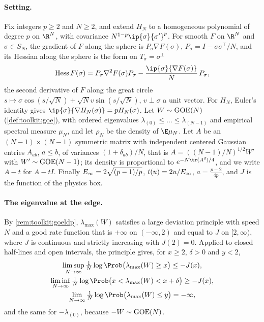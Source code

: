 \begin{refsection}
\paragraph{Setting.} Fix integers $p\ge2$ and $N\ge2$, and extend $H_N$ to a homogeneous polynomial of degree $p$ on $\R^N$, with covariance $N^{1-p}\ip{\sigma}{\sigma'}^p$. For smooth $F$ on $\R^N$ and $\sigma\in S_N$, the gradient of $F$ along the sphere is $P_\sigma\nabla F(\sigma)$, $P_\sigma=I-\sigma\sigma^\top/N$, and its Hessian along the sphere is the form on $T_\sigma=\sigma^\perp$
\begin{equation}\label{eq:kacrice:hess}
\kacriceHess F(\sigma)=P_\sigma\nabla^2F(\sigma)P_\sigma-\frac{\ip{\sigma}{\nabla F(\sigma)}}N\,P_\sigma,
\end{equation}
the second derivative of $F$ along the great circle $s\mapsto\sigma\cos(s/\sqrt N)+\sqrt Nv\sin(s/\sqrt N)$, $v\perp\sigma$ a unit vector. For $H_N$, Euler's identity gives $\ip{\sigma}{\nabla H_N(\sigma)}=pH_N(\sigma)$. Let $W\sim\mathrm{GOE}(N)$ (\cref{def:toolkit:goe}), with ordered eigenvalues $\lambda_{(0)}\le\dots\le\lambda_{(N-1)}$ and empirical spectral measure $\mu_N$, and let $\rho_N$ be the density of $\E\mu_N$. Let $A$ be an $(N-1)\times(N-1)$ symmetric matrix with independent centered Gaussian entries $A_{ab}$, $a\le b$, of variances $(1+\delta_{ab})/N$, that is $A=((N-1)/N)^{1/2}W'$ with $W'\sim\mathrm{GOE}(N-1)$; its density is proportional to $e^{-N\tr(A^2)/4}$, and we write $A-t$ for $A-tI$. Finally $E_\infty=2\sqrt{(p-1)/p}$, $t(u)=2u/E_\infty$, $a=\frac{p-2}{4p}$, and $J$ is the function of the physics box.

\paragraph{The eigenvalue at the edge.} By \cref{rem:toolkit:goeldp}, $\lambda_{\max}(W)$ satisfies a large deviation principle with speed $N$ and a good rate function that is $+\infty$ on $(-\infty,2)$ and equal to $J$ on $[2,\infty)$, where $J$ is continuous and strictly increasing with $J(2)=0$. Applied to closed half-lines and open intervals, the principle gives, for $x\ge2$, $\delta>0$ and $y<2$,
\begin{gather}
\limsup_{N\to\infty}\tfrac1N\log\Prob\bigl(\lambda_{\max}(W)\ge x\bigr)\le-J(x),\label{eq:kacrice:ldp}\\
\liminf_{N\to\infty}\tfrac1N\log\Prob\bigl(x<\lambda_{\max}(W)<x+\delta\bigr)\ge-J(x),\notag\\
\lim_{N\to\infty}\tfrac1N\log\Prob\bigl(\lambda_{\max}(W)\le y\bigr)=-\infty,\notag
\end{gather}
and the same for $-\lambda_{(0)}$, because $-W\sim\mathrm{GOE}(N)$.


\end{refsection}
